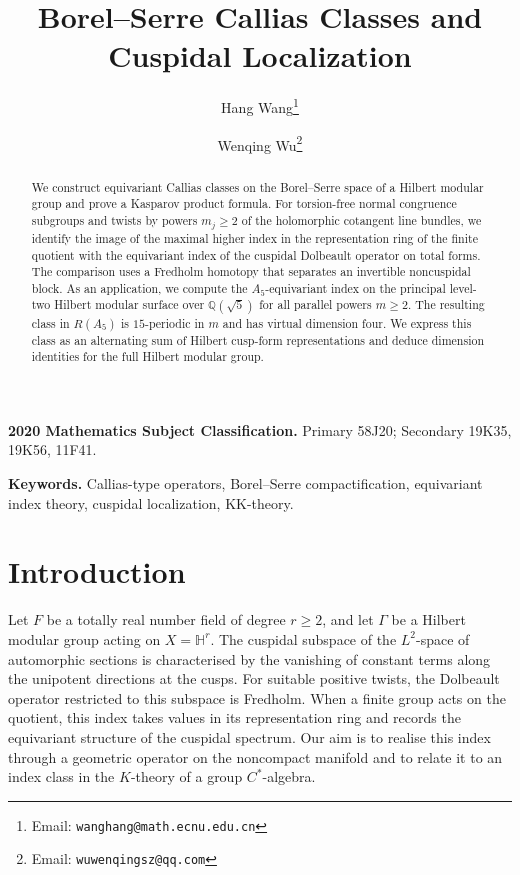 \documentclass[11pt]{article}
\title{Borel--Serre Callias Classes and Cuspidal Localization}
\author[1]{Hang Wang\thanks{Email: \texttt{wanghang@math.ecnu.edu.cn}}}
\author[1]{Wenqing Wu\thanks{Email: \texttt{wuwenqingsz@qq.com}}}
\affil[1]{Research Center for Operator Algebras,
School of Mathematical Sciences,
East China Normal University,
Shanghai, China}
\theoremstyle{definition}
\theoremstyle{plain}
\numberwithin{equation}{section}
\newcommand{\HH}{\mathbb H}
\begin{document}
\maketitle
\begin{abstract}
We construct equivariant Callias classes on the Borel--Serre space of a
Hilbert modular group and prove a Kasparov product formula.
For torsion-free normal congruence subgroups and twists by powers
$m_j\geq2$ of the holomorphic cotangent line bundles, we identify the
image of the maximal higher index in the representation ring of the
finite quotient with the equivariant index of the cuspidal Dolbeault
operator on total forms.
The comparison uses a Fredholm homotopy that separates an invertible
noncuspidal block.
As an application, we compute the $A_5$-equivariant index on the
principal level-two Hilbert modular surface over $\mathbb Q(\sqrt5)$
for all parallel powers $m\geq2$.
The resulting class in $R(A_5)$ is $15$-periodic in $m$ and has
virtual dimension four.
We express this class as an alternating sum of Hilbert cusp-form
representations and deduce dimension identities for the full Hilbert
modular group.
\end{abstract}

\noindent\textbf{2020 Mathematics Subject Classification.}
Primary 58J20; Secondary 19K35, 19K56, 11F41.

\medskip
\noindent\textbf{Keywords.}
Callias-type operators, Borel--Serre compactification,
equivariant index theory, cuspidal localization, KK-theory.

\section*{Introduction}
\label{sec:introduction}

Let $F$ be a totally real number field of degree $r\geq2$,
and let $\Gamma$ be a Hilbert modular group acting on
$X=\HH^r$. The cuspidal subspace of the $L^2$-space of
automorphic sections is characterised by the vanishing
of constant terms along the unipotent directions at the
cusps. For suitable positive twists, the Dolbeault operator
restricted to this subspace is Fredholm. When a finite group acts on the quotient, this
index takes values in its representation ring and
records the equivariant structure of the cuspidal
spectrum. Our aim is to realise this index through a
geometric operator on the noncompact manifold and to
relate it to an index class in the $K$-theory of a group
$C^*$-algebra.
\end{document}
